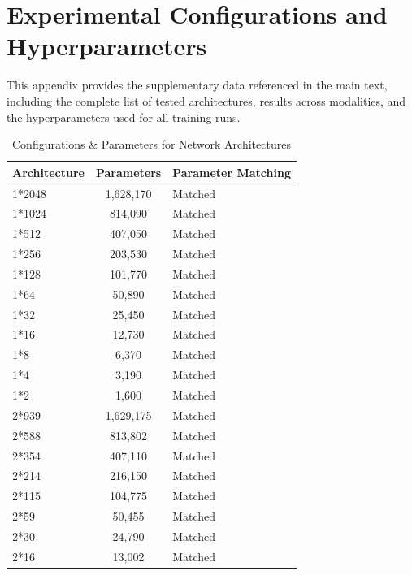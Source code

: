 \documentclass[conference]{IEEEtran}
\begin{document}
\clearpage

\FloatBarrier
\appendix
\section{Experimental Configurations and Hyperparameters}
\label{sec:appendix_a}

This appendix provides the supplementary data referenced in the main text, including the complete list of tested architectures, results across modalities, and the hyperparameters used for all training runs.

\begin{table}[ht]
\tiny  %
\centering
\caption{Configurations \& Parameters for Network Architectures}
\label{tab:architecture_parameters}
\begin{tabular}{lcl}
\toprule
\textbf{Architecture} & \textbf{Parameters} & \textbf{Parameter Matching} \\
\midrule
1*2048     & 1,628,170       & Matched \\
1*1024     & 814,090         & Matched \\
1*512      & 407,050         & Matched \\
1*256      & 203,530         & Matched \\
1*128      & 101,770         & Matched \\
1*64       & 50,890          & Matched \\
1*32       & 25,450          & Matched \\
1*16       & 12,730          & Matched \\
1*8        & 6,370           & Matched \\
1*4        & 3,190           & Matched \\
1*2        & 1,600           & Matched \\
2*939      & 1,629,175       & Matched \\
2*588      & 813,802         & Matched \\
2*354      & 407,110         & Matched \\
2*214      & 216,150         & Matched \\
2*115      & 104,775         & Matched \\
2*59       & 50,455          & Matched \\
2*30       & 24,790          & Matched \\
2*16       & 13,002          & Matched \\

\end{tabular}
\end{table}
\end{document}
